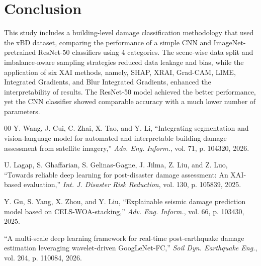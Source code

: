 \documentclass[conference]{IEEEtran}
\begin{document}
{{\section{Conclusion}
This study includes a building-level damage classification methodology that used the xBD dataset, comparing the performance of a simple CNN and ImageNet-pretrained ResNet-50 classifiers using 4 categories. The scene-wise data split and imbalance-aware sampling strategies reduced data leakage and bias, while the application of six XAI methods, namely, SHAP, XRAI, Grad-CAM, LIME, Integrated Gradients, and Blur Integrated Gradients, enhanced the interpretability of results. The ResNet-50 model achieved the better performance, yet the CNN classifier showed comparable accuracy with a much lower number of parameters.


\begin{thebibliography}{00}
 Y. Wang, J. Cui, C. Zhai, X. Tao, and Y. Li, ``Integrating segmentation and vision-language model for automated and interpretable building damage assessment from satellite imagery,'' \textit{Adv. Eng. Inform.}, vol. 71, p. 104320, 2026.

 U. Lagap, S. Ghaffarian, S. Gelinas-Gagne, J. Jilma, Z. Liu, and Z. Luo, ``Towards reliable deep learning for post-disaster damage assessment: An XAI-based evaluation,'' \textit{Int. J. Disaster Risk Reduction}, vol. 130, p. 105839, 2025.

 Y. Gu, S. Yang, X. Zhou, and Y. Liu, ``Explainable seismic damage prediction model based on CELS-WOA-stacking,'' \textit{Adv. Eng. Inform.}, vol. 66, p. 103430, 2025.

 ``A multi-scale deep learning framework for real-time post-earthquake damage estimation leveraging wavelet-driven GoogLeNet-FC,'' \textit{Soil Dyn. Earthquake Eng.}, vol. 204, p. 110084, 2026.


\end{thebibliography}}}
\end{document}
